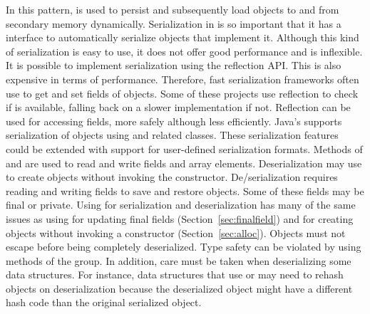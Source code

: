 \newcommand\foundinserialization{32}
\newcommand\usedbyserialization{5689}
\newcommand\mostusedserialization{\serializationmost}
\newcommand\membersserialization{\member{object\-Field\-Offset} and methods of the \smugroup{Heap Get} and \smugroup{Heap Put} groups}
\newcommand\nameserialization{Serialization/Deserialization}

%
{In this pattern, \smu{} is used to persist and subsequently load objects to and from secondary memory dynamically.
Serialization in \java{} is so important that it has a  interface to automatically serialize objects that implement it.
Although this kind of serialization is easy to use, it does not offer good
performance and is inflexible.
It is possible to implement serialization using the reflection API. This is
also expensive in terms of performance. Therefore, fast serialization frameworks
often use \unsafe{} to get and set fields of objects.
Some of these projects use reflection to check if \smu{} is available, falling
back on a slower implementation if not.}
{Reflection can be used for accessing fields, more safely although less
  efficiently. Java's supports serialization of objects using
   and related classes. These serialization features could be extended with support for
user-defined serialization formats.}
{Methods of  and  are used to read and
  write fields and array elements. Deserialization may use
 to create objects without invoking the constructor.}
{De/serialization requires reading and writing fields to save and restore
objects. Some of these fields may be final or private.}{
Using \unsafe{} for serialization and deserialization has many of the same issues
as using \unsafe{} for updating final fields (Section~\ref{sec:finalfield}) and for creating objects without
invoking a constructor (Section~\ref{sec:alloc}). Objects must not escape before being completely
deserialized. Type safety can be violated by using methods of the
 group. In addition, care must be taken when deserializing
some data structures. For instance, data structures that use
 or  may need to rehash objects on
deserialization because the deserialized object might have a different
hash code than the original serialized object.}

